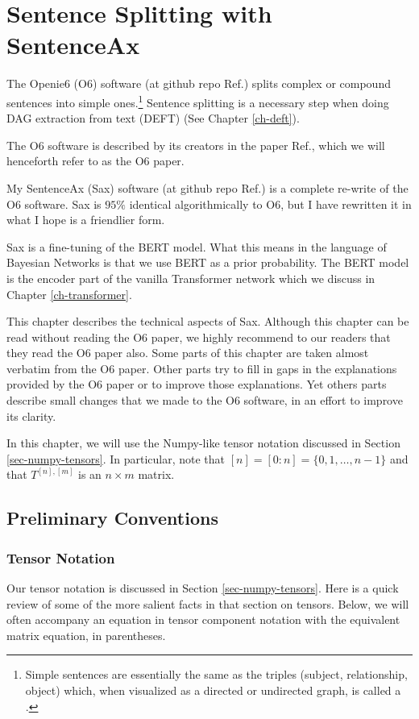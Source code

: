 \chapter{Sentence Splitting with SentenceAx}
\label{ch-sentence-ax}

The Openie6 (O6) software
(at github repo Ref.\cite{openie6-github})
splits complex or compound
sentences into
simple ones.\footnote{Simple sentences are essentially
the same  as the triples (subject, relationship, object) which, when visualized as a directed or undirected graph,
is called a  .} Sentence splitting is a necessary step
 when doing
DAG extraction from text (DEFT) (See Chapter \ref{ch-deft}).

The O6 software is described by its creators
 in the paper Ref.\cite{openie6-paper},
 which we will henceforth refer to as
 the O6 paper.

My SentenceAx (Sax) software (at github repo Ref.\cite{sentence-ax-github}) is a complete re-write of
the  O6 software.
Sax is $95\%$ identical algorithmically to O6, but I have rewritten it in what I hope is a friendlier form.


 Sax is a fine-tuning of the BERT model.
 What this means in the
 language of Bayesian
 Networks is that we use
 BERT as a prior
 probability.
 The BERT model is the encoder part of the
 vanilla Transformer network which
 we discuss in Chapter \ref{ch-transformer}.

 This chapter describes the technical
 aspects of Sax. Although this chapter
 can be read without reading the O6 paper, we highly recommend to
 our readers that they read the O6 paper also.
 Some parts of this chapter are taken almost verbatim
 from the O6 paper. Other parts try to fill in gaps in the
 explanations provided by the O6 paper or to improve those explanations. Yet others parts describe small changes that we made to the O6 software, in an effort to improve its clarity.




 In this chapter, we
 will use the Numpy-like tensor notation
 discussed in Section
 \ref{sec-numpy-tensors}. In particular, note that $[n] = [0:n] = \{0, 1,\ldots, n-1\}$ and that $T^{[n], [m]}$ is an $n\times m$ matrix.

\section{Preliminary Conventions}

\subsection{Tensor Notation}
Our tensor notation is discussed in Section
\ref{sec-numpy-tensors}.
Here is a quick review
of some of the more salient
facts in that section on tensors.
Below, we will often accompany
  an equation in tensor
  component notation
  with the equivalent matrix equation,
  in parentheses.

